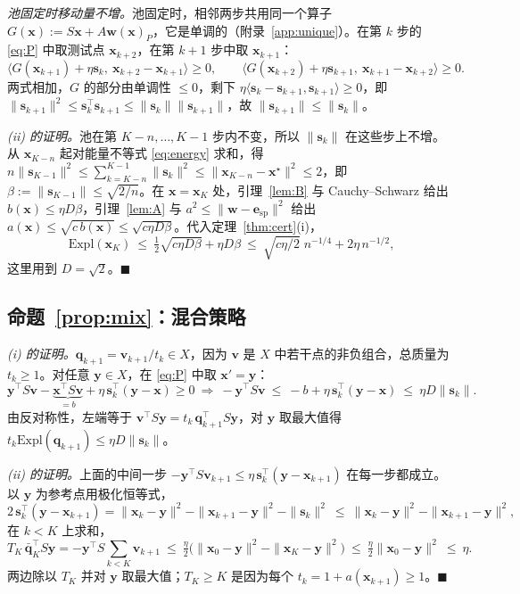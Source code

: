 \documentclass{article}
\theoremstyle{plain}
\theoremstyle{remark}
\newcommand{\Expl}{\mathrm{Expl}}
\newcommand{\bx}{{\bm{x}}}
\newcommand{\by}{{\bm{y}}}
\newcommand{\bv}{{\bm{v}}}
\newcommand{\bw}{{\bm{w}}}
\newcommand{\bq}{{\bm{q}}}
\newcommand{\be}{{\bm{e}}}
\newcommand{\xs}{\bx^{\star}}
\newcommand{\dx}{{\bm{s}}}
\newcommand{\esp}{\be_{\mathrm{sp}}}
\begin{document}
\textit{池固定时移动量不增。}池固定时，相邻两步共用同一个算子 $G(\bx):=S\bx+A\bw(\bx)_P$，它是单调的（附录~\ref{app:unique}）。在第 $k$ 步的 \eqref{eq:P} 中取测试点 $\bx_{k+2}$，在第 $k+1$ 步中取 $\bx_{k+1}$：
\[
\langle G(\bx_{k+1})+\eta\dx_k,\ \bx_{k+2}-\bx_{k+1}\rangle\ge0,\qquad\langle G(\bx_{k+2})+\eta\dx_{k+1},\ \bx_{k+1}-\bx_{k+2}\rangle\ge0 .
\]
两式相加，$G$ 的部分由单调性 $\le0$，剩下 $\eta\langle\dx_k-\dx_{k+1},\dx_{k+1}\rangle\ge0$，即 $\|\dx_{k+1}\|^2\le\dx_k^\top\dx_{k+1}\le\|\dx_k\|\|\dx_{k+1}\|$，故 $\|\dx_{k+1}\|\le\|\dx_k\|$。

\textit{(ii) 的证明。}池在第 $K-n,\dots,K-1$ 步内不变，所以 $\|\dx_k\|$ 在这些步上不增。从 $\bx_{K-n}$ 起对能量不等式 \eqref{eq:energy} 求和，得 $n\|\dx_{K-1}\|^2\le\sum_{k=K-n}^{K-1}\|\dx_k\|^2\le\|\bx_{K-n}-\xs\|^2\le2$，即 $\beta:=\|\dx_{K-1}\|\le\sqrt{2/n}$。在 $\bx=\bx_K$ 处，引理~\ref{lem:B} 与 Cauchy--Schwarz 给出 $b(\bx)\le\eta D\beta$，引理~\ref{lem:A} 与 $a^2\le\|\bw-\esp\|^2$ 给出 $a(\bx)\le\sqrt{c\,b(\bx)}\le\sqrt{c\eta D\beta}$。代入定理~\ref{thm:cert}(i)，
\[
\Expl(\bx_K)\ \le\ \tfrac12\sqrt{c\eta D\beta}+\eta D\beta\ \le\ \sqrt{c\eta/2}\;n^{-1/4}+2\eta\,n^{-1/2},
\]
这里用到 $D=\sqrt2$。\hfill$\blacksquare$

\subsection{命题~\ref{prop:mix}：混合策略}
\label{app:mix}

\textit{(i) 的证明。}$\bq_{k+1}=\bv_{k+1}/t_k\in X$，因为 $\bv$ 是 $X$ 中若干点的非负组合，总质量为 $t_k\ge1$。对任意 $\by\in X$，在 \eqref{eq:P} 中取 $\bx'=\by$：
\[
\by^\top S\bv-\underbrace{\bx^\top S\bv}_{=b}+\eta\,\dx_k^\top(\by-\bx)\ge0
\ \Longrightarrow\
-\by^\top S\bv\ \le\ -b+\eta\,\dx_k^\top(\by-\bx)\ \le\ \eta D\|\dx_k\| .
\]
由反对称性，左端等于 $\bv^\top S\by=t_k\,\bq_{k+1}^\top S\by$，对 $\by$ 取最大值得 $t_k\Expl(\bq_{k+1})\le\eta D\|\dx_k\|$。

\textit{(ii) 的证明。}上面的中间一步 $-\by^\top S\bv_{k+1}\le\eta\,\dx_k^\top(\by-\bx_{k+1})$ 在每一步都成立。以 $\by$ 为参考点用极化恒等式，
\[
2\,\dx_k^\top(\by-\bx_{k+1})=\|\bx_k-\by\|^2-\|\bx_{k+1}-\by\|^2-\|\dx_k\|^2\ \le\ \|\bx_k-\by\|^2-\|\bx_{k+1}-\by\|^2 ,
\]
在 $k<K$ 上求和，
\[
T_K\,\bar{\bq}_K^\top S\by=-\by^\top S\sum_{k<K}\bv_{k+1}\ \le\ \tfrac\eta2\big(\|\bx_0-\by\|^2-\|\bx_K-\by\|^2\big)\ \le\ \tfrac\eta2\|\bx_0-\by\|^2\ \le\ \eta .
\]
两边除以 $T_K$ 并对 $\by$ 取最大值；$T_K\ge K$ 是因为每个 $t_k=1+a(\bx_{k+1})\ge1$。\hfill$\blacksquare$
\end{document}
